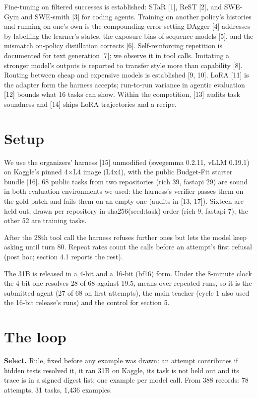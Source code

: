 \documentclass[
  11pt,
  a4paper,
]{article}
\begin{document}
Fine-tuning on filtered successes is established: STaR {[}1{]}, ReST
{[}2{]}, and SWE-Gym and SWE-smith {[}3{]} for coding agents. Training
on another policy's histories and running on one's own is the
compounding-error setting DAgger {[}4{]} addresses by labelling the
learner's states, the exposure bias of sequence models {[}5{]}, and the
mismatch on-policy distillation corrects {[}6{]}. Self-reinforcing
repetition is documented for text generation {[}7{]}; we observe it in
tool calls. Imitating a stronger model's outputs is reported to transfer
style more than capability {[}8{]}. Routing between cheap and expensive
models is established {[}9, 10{]}. LoRA {[}11{]} is the adapter form the
harness accepts; run-to-run variance in agentic evaluation {[}12{]}
bounds what 16 tasks can show. Within the competition, {[}13{]} audits
task soundness and {[}14{]} ships LoRA trajectories and a recipe.

\section{Setup}\label{setup}

We use the organizers' harness {[}15{]} unmodified (swegemma 0.2.11,
vLLM 0.19.1) on Kaggle's pinned 4×L4 image (L4x4), with the public
Budget-Fit starter bundle {[}16{]}. 68 public tasks from two
repositories (rich 39, fastapi 29) are sound in both evaluation
environments we used: the harness's verifier passes them on the gold
patch and fails them on an empty one (audits in {[}13, 17{]}). Sixteen
are held out, drawn per repository in sha256(seed:task) order (rich 9,
fastapi 7); the other 52 are training tasks.

After the 28th tool call the harness refuses further ones but lets the
model keep asking until turn 80. Repeat rates count the calls before an
attempt's first refusal (post hoc; section 4.1 reports the rest).

The 31B is released in a 4-bit and a 16-bit (bf16) form. Under the
8-minute clock the 4-bit one resolves 28 of 68 against 19.5, means over
repeated runs, so it is the submitted agent (27 of 68 on first
attempts), the main teacher (cycle 1 also used the 16-bit release's
runs) and the control for section 5.

\section{The loop}\label{the-loop}

\textbf{Select.} Rule, fixed before any example was drawn: an attempt
contributes if hidden tests resolved it, it ran 31B on Kaggle, its task
is not held out and its trace is in a signed digest list; one example
per model call. From 388 records: 78 attempts, 31 tasks, 1,436 examples.
\end{document}
